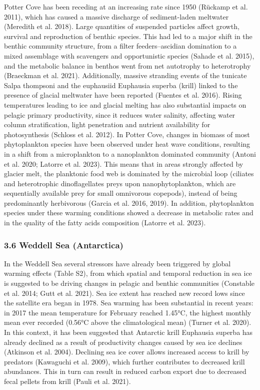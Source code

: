 \documentclass[
]{article}
\begin{document}
Potter Cove has been receding at an increasing rate since 1950 (Rückamp
et al. 2011), which has caused a massive discharge of sediment-laden
meltwater (Meredith et al. 2018). Large quantities of suspended
particles affect growth, survival and reproduction of benthic species.
This had led to a major shift in the benthic community structure, from a
filter feeders--ascidian domination to a mixed assemblage with
scavengers and opportunistic species (Sahade et al. 2015), and the
metabolic balance in benthos went from net autotrophy to heterotrophy
(Braeckman et al. 2021). Additionally, massive stranding events of the
tunicate Salpa thompsoni and the euphausiid Euphausia superba (krill)
linked to the presence of glacial meltwater have been reported (Fuentes
et al. 2016). Rising temperatures leading to ice and glacial melting has
also substantial impacts on pelagic primary productivity, since it
reduces water salinity, affecting water column stratification, light
penetration and nutrient availability for photosynthesis (Schloss et al.
2012). In Potter Cove, changes in biomass of most phytoplankton species
have been observed under heat wave conditions, resulting in a shift from
a microplankton to a nanoplankton dominated community (Antoni et al.
2020; Latorre et al. 2023). This means that in areas strongly affected
by glacier melt, the planktonic food web is dominated by the microbial
loop (ciliates and heterotrophic dinoflagellates preys upon
nanophytoplankton, which are sequentially available prey for small
omnivorous copepods), instead of being predominantly herbivorous (Garcia
et al. 2016, 2019). In addition, phytoplankton species under these
warming conditions showed a decrease in metabolic rates and in the
quality of the fatty acids composition (Latorre et al. 2023).

\subsubsection{3.6 Weddell Sea
(Antarctica)}\label{weddell-sea-antarctica}

In the Weddell Sea several stressors have already been triggered by
global warming effects (Table S2), from which spatial and temporal
reduction in sea ice is suggested to be driving changes in pelagic and
benthic communities (Constable et al. 2014; Gutt et al. 2021). Sea ice
extent has reached new record lows since the satellite era began in
1978. Sea warming has been substantial in recent years: in 2017 the mean
temperature for February reached 1.45°C, the highest monthly mean ever
recorded (0.56°C above the climatological mean) (Turner et al. 2020). In
this context, it has been suggested that Antarctic krill Euphausia
superba has already declined as a result of productivity changes caused
by sea ice declines (Atkinson et al. 2004). Declining sea ice cover
allows increased access to krill by predators (Kawaguchi et al. 2009),
which further contributes to decreased krill abundances. This in turn
can result in reduced carbon export due to decreased fecal pellets from
krill (Pauli et al. 2021).
\end{document}
